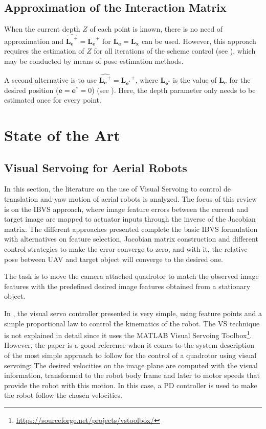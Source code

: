 \subsection*{Approximation of the Interaction Matrix}

When the current depth $Z$ of each point is known, there is no need of approximation and $\widehat{\bm{L_e}^+} = \bm{L_e}^+$ for $\bm{L_e} = \bm{L_x}$ can be used. However, this approach requires the estimation of $Z$ for all iterations of the scheme control (see \cite{hutchinson_1996}), which may be conducted by means of pose estimation methods.

A second alternative is to use $\widehat{\bm{L_e}^+} = \bm{L_{e^\ast}}^+$, where $\bm{L_{e^\ast}}$ is the value of $\bm{L_{e}}$ for the desired position ($\bm{e} = \bm{e}^\ast = 0$) (see \cite{espiau_1992}). Here, the depth parameter only needs to be estimated once for every point.

\section{State of the Art}

\subsection{Visual Servoing for Aerial Robots}

In this section, the literature on the use of Visual Servoing to control de translation and yaw motion of aerial robots is analyzed. The focus of this review is on the IBVS approach, where image feature errors between the current and target image are mapped to actuator inputs through the inverse of the Jacobian matrix. The different approaches presented complete the basic IBVS formulation with alternatives on feature selection, Jacobian matrix construction and different control strategies to make the error converge to zero, and with it, the relative pose between UAV and target object will converge to the desired one.

The task is to move the camera attached quadrotor to match the observed image features with the predefined desired image features obtained from a stationary object.

In \cite{ceren_vision-based_2009}, the visual servo controller presented is very simple, using feature points and a simple proportional law to control the kinematics of the robot. The VS technique is not explained in detail since it uses the MATLAB Visual Servoing Toolbox\footnote{\url{https://sourceforge.net/projects/vstoolbox/}}. However, the paper is a good reference when it comes to the system description of the most simple approach to follow for the control of a quadrotor using visual servoing: The desired velocities on the image plane are computed with the visual information, transformed to the robot body frame and later to motor speeds that provide the robot with this motion. In this case, a PD controller is used to make the robot follow the chosen velocities. 

